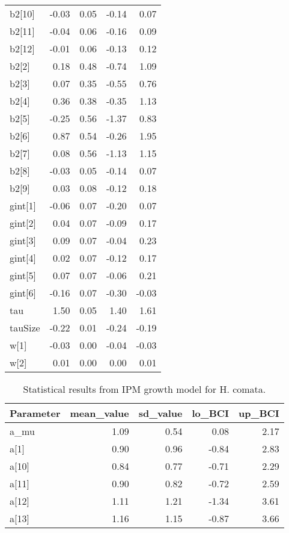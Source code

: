\documentclass[12pt,]{article}
\begin{document}
\begin{table}[ht]
{\begin{tabular}{lrrrr}
  b2[10] & -0.03 & 0.05 & -0.14 & 0.07 \\ 
  b2[11] & -0.04 & 0.06 & -0.16 & 0.09 \\ 
  b2[12] & -0.01 & 0.06 & -0.13 & 0.12 \\ 
  b2[2] & 0.18 & 0.48 & -0.74 & 1.09 \\ 
  b2[3] & 0.07 & 0.35 & -0.55 & 0.76 \\ 
  b2[4] & 0.36 & 0.38 & -0.35 & 1.13 \\ 
  b2[5] & -0.25 & 0.56 & -1.37 & 0.83 \\ 
  b2[6] & 0.87 & 0.54 & -0.26 & 1.95 \\ 
  b2[7] & 0.08 & 0.56 & -1.13 & 1.15 \\ 
  b2[8] & -0.03 & 0.05 & -0.14 & 0.07 \\ 
  b2[9] & 0.03 & 0.08 & -0.12 & 0.18 \\ 
  gint[1] & -0.06 & 0.07 & -0.20 & 0.07 \\ 
  gint[2] & 0.04 & 0.07 & -0.09 & 0.17 \\ 
  gint[3] & 0.09 & 0.07 & -0.04 & 0.23 \\ 
  gint[4] & 0.02 & 0.07 & -0.12 & 0.17 \\ 
  gint[5] & 0.07 & 0.07 & -0.06 & 0.21 \\ 
  gint[6] & -0.16 & 0.07 & -0.30 & -0.03 \\ 
  tau & 1.50 & 0.05 & 1.40 & 1.61 \\ 
  tauSize & -0.22 & 0.01 & -0.24 & -0.19 \\ 
  w[1] & -0.03 & 0.00 & -0.04 & -0.03 \\ 
  w[2] & 0.01 & 0.00 & 0.00 & 0.01 \\ 
   \hline
\end{tabular}
}
\end{table}\begin{table}[ht]
\centering
\caption{Statistical results from IPM growth model for H. comata.} 
{\footnotesize
\begin{tabular}{lrrrr}
  \hline
Parameter & mean\_value & sd\_value & lo\_BCI & up\_BCI \\ 
  \hline
a\_mu & 1.09 & 0.54 & 0.08 & 2.17 \\ 
  a[1] & 0.90 & 0.96 & -0.84 & 2.83 \\ 
  a[10] & 0.84 & 0.77 & -0.71 & 2.29 \\ 
  a[11] & 0.90 & 0.82 & -0.72 & 2.59 \\ 
  a[12] & 1.11 & 1.21 & -1.34 & 3.61 \\ 
  a[13] & 1.16 & 1.15 & -0.87 & 3.66 \\ 

\end{tabular}}
\end{table}
\end{document}
